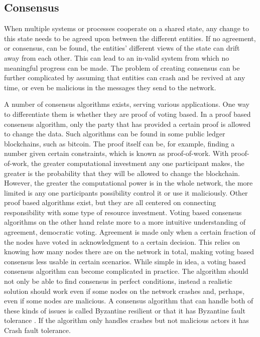 \documentclass[english, biblatex, digitaloutput]{kththesis}
\begin{document}
\subsection{Consensus}

When multiple systems or processes cooperate on a shared state, any change to this state needs to be agreed upon between the different entities. If no agreement, or consensus, can be found, the entities' different views of the state can drift away from each other. This can lead to an in-valid system from which no meaningful progress can be made. The problem of creating consensus can be further complicated by assuming that entities can crash and be revived at any time, or even be malicious in the messages they send to the network.

A number of consensus algorithms exists, serving various applications. One way to differentiate them is whether they are proof of voting based. In a proof based consensus algorithm, only the party that has provided a certain proof is allowed to change the data. Such algorithms can be found in some public ledger blockchains, such as bitcoin. The proof itself can be, for example, finding a number given certain constraints, which is known as proof-of-work. With proof-of-work, the greater computational investment any one participant makes, the greater is the probability that they will be allowed to change the blockchain. However, the greater the computational power is in the whole network, the more limited is any one participants possibility control it or use it maliciously. Other proof based algorithms exist, but they are all centered on connecting responsibility with some type of resource investment. Voting based consensus algorithms on the other hand relate more to a more intuitive understanding of agreement, \ie democratic voting. Agreement is made only when a certain fraction of the nodes have voted in acknowledgment to a certain decision. This relies on knowing how many nodes there are on the network in total, making voting based consensus less usable in certain scenarios. While simple in idea, a voting based consensus algorithm can become complicated in practice. The algorithm should not only be able to find consensus in perfect conditions, instead a realistic solution should work even if some nodes on the network crashes and, perhaps, even if some nodes are malicious. A consensus algorithm that can handle both of these kinds of issues is called Byzantine resilient \cite{goos_consensus_1983} or that it has Byzantine fault tolerance \cite{nguyen_survey_2018}. If the algorithm only handles crashes but not malicious actors it has Crash fault tolerance.
\end{document}
